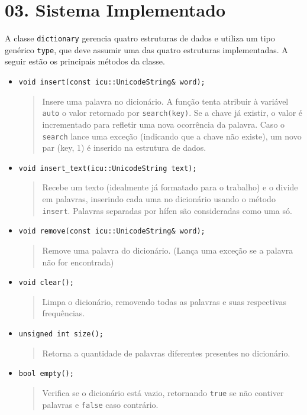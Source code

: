 \documentclass{article}
\begin{document}
\section*{03. Sistema Implementado}

A classe \texttt{dictionary} gerencia quatro estruturas de dados e utiliza um tipo genérico \texttt{type}, que deve assumir uma das quatro estruturas implementadas. A seguir estão os principais métodos da classe.
\begin{itemize}
    \item \texttt{void insert(const icu::UnicodeString\& word);}
    \begin{quote}
        Insere uma palavra no dicionário. A função tenta atribuir à variável \texttt{auto} o valor retornado por \texttt{search(key)}. Se a chave já existir, o valor é incrementado para refletir uma nova ocorrência da palavra. Caso o \texttt{search} lance uma exceção (indicando que a chave não existe), um novo par (key, 1) é inserido na estrutura de dados.
    \end{quote}

    \item \texttt{void insert\_text(icu::UnicodeString text);}
    \begin{quote}
        Recebe um texto (idealmente já formatado para o trabalho) e o divide em palavras, inserindo cada uma no dicionário usando o método \texttt{insert}. Palavras separadas por hífen são consideradas como uma só.
    \end{quote}

    \item \texttt{void remove(const icu::UnicodeString\& word);}
    \begin{quote}
        Remove uma palavra do dicionário. (Lança uma exceção se a palavra não for encontrada)
    \end{quote}

    \item \texttt{void clear();}
    \begin{quote}
        Limpa o dicionário, removendo todas as palavras e suas respectivas frequências.
    \end{quote}

    \item \texttt{unsigned int size();}
    \begin{quote}
        Retorna a quantidade de palavras diferentes presentes no dicionário.
    \end{quote}

    \item \texttt{bool empty();}
    \begin{quote}
        Verifica se o dicionário está vazio, retornando \texttt{true} se não contiver palavras e \texttt{false} caso contrário.
    \end{quote}


\end{itemize}
\end{document}
